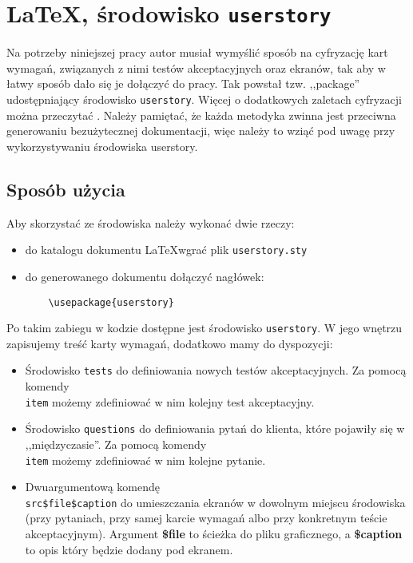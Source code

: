 \chapter{\LaTeX, środowisko \texttt{userstory}}
\label{cha:dodatekA}

Na potrzeby niniejszej pracy autor musiał wymyślić sposób na cyfryzację kart wymagań, związanych z nimi testów akceptacyjnych oraz ekranów, tak aby w łatwy sposób dało się je dołączyć do pracy. Tak powstał tzw. ,,package'' udostępniający środowisko \texttt{userstory}. Więcej o dodatkowych zaletach cyfryzacji można przeczytać . Należy pamiętać, że każda metodyka zwinna jest przeciwna generowaniu bezużytecznej dokumentacji, więc należy to wziąć pod uwagę przy wykorzystywaniu środowiska userstory.

\section{Sposób użycia}
\label{sec:dodatekAsu}

Aby skorzystać ze środowiska należy wykonać dwie rzeczy:
\begin{itemize}
    \item do katalogu dokumentu \LaTeX wgrać plik \texttt{userstory.sty}
    \item do generowanego dokumentu dołączyć nagłówek:
    \begin{lstlisting}
    \usepackage{userstory}
    \end{lstlisting}
\end{itemize}

Po takim zabiegu w kodzie dostępne jest środowisko \texttt{userstory}. W jego wnętrzu zapisujemy treść karty wymagań, dodatkowo mamy do dyspozycji:
\begin{itemize}
    \item Środowisko \texttt{tests} do definiowania nowych testów akceptacyjnych. Za pomocą komendy \texttt{\\item} możemy zdefiniować w nim kolejny test akceptacyjny.
    \item Środowisko \texttt{questions} do definiowania pytań do klienta, które pojawiły się w ,,międzyczasie''. Za pomocą komendy \texttt{\\item} możemy zdefiniować w nim kolejne pytanie.
    \item Dwuargumentową komendę \texttt{\\src{\$file}{\$caption}} do umieszczania ekranów w dowolnym miejscu środowiska (przy pytaniach, przy samej karcie wymagań albo przy konkretnym teście akceptacyjnym). Argument \textbf{\$file} to ścieżka do pliku graficznego, a \textbf{\$caption} to opis który będzie dodany pod ekranem.
\end{itemize}

